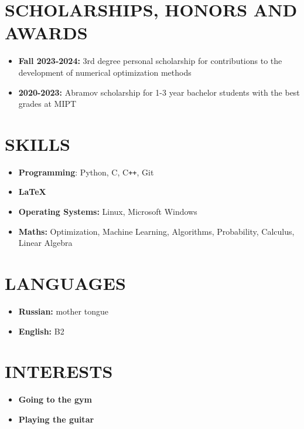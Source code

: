 \documentclass[11pt]{moderncv}
\begin{document}
    \section{SCHOLARSHIPS, HONORS AND AWARDS}

        \begin{itemize}
            \item \textbf{Fall 2023-2024:} 3rd degree personal scholarship for contributions to the development of numerical optimization methods
            \item \textbf{2020-2023:} Abramov scholarship for 1-3 year bachelor students with the best grades at MIPT
        \end{itemize}

    \section{SKILLS}
    
        \begin{itemize}
            \item \textbf{Programming}: Python, C, C\texttt{++}, Git
            \item \textbf{\LaTeX}
            \item \textbf{Operating Systems:} Linux, Microsoft Windows
            \item \textbf{Maths:} Optimization, Machine Learning, Algorithms, Probability, Calculus, Linear Algebra
        \end{itemize}

    \section{LANGUAGES}

        \begin{itemize}
            \item \textbf{Russian:} mother tongue
            \item \textbf{English:} B2
        \end{itemize}

    \section{INTERESTS}

        \begin{itemize}
            \item \textbf{Going to the gym}
            \item \textbf{Playing the guitar}
        \end{itemize}

    

    
\end{document}
